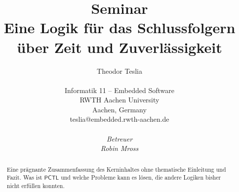 \documentclass{lni}
\author{
	Theodor Teslia \\ 
	\\ 
	Informatik 11 -- Embedded Software \\ 
	RWTH Aachen University \\ 
	Aachen, Germany \\ 
	teslia@embedded.rwth-aachen.de\\
	\\
	\textit{Betreuer}\\
	\textit{Robin Mross}\\ %
}
\title{\small{Seminar} \\ \vspace{0.5cm} \Large{Eine Logik für das Schlussfolgern über Zeit und Zuverlässigkeit}}
\theoremstyle{def_style}
\theoremstyle{break}
\newcommand{\PCTL}{\mathsf{PCTL}}
\begin{document}
\maketitle

\begin{abstract}
Eine prägnante Zusammenfassung des Kerninhaltes ohne thematische Einleitung und Fazit. Was ist $\PCTL$ und welche Probleme kann es lösen, die andere Logiken bisher nicht erfüllen konnten.
\end{abstract}














\end{document}

